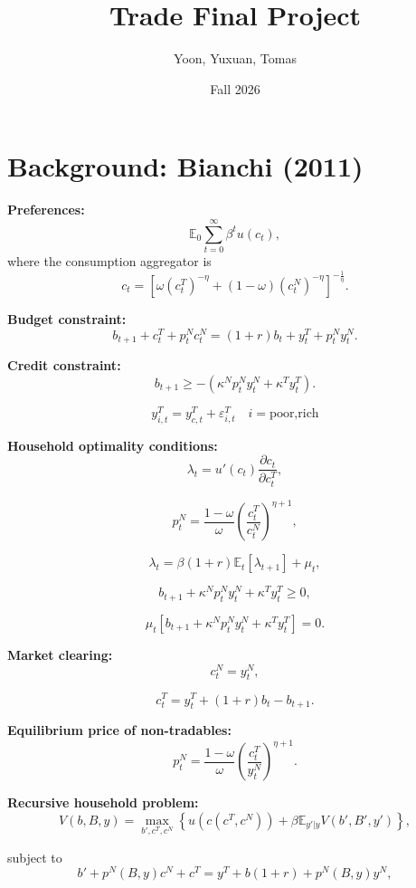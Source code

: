 \documentclass[11pt]{article}
\begin{document}
\title{Trade Final Project}


\author{Yoon, Yuxuan, Tomas}


\date{Fall 2026}

\maketitle
\tableofcontents{}

\large

\newpage

\section{Background: Bianchi (2011)}

\textbf{Preferences:}
\[
\mathbb{E}_0\sum_{t=0}^{\infty}\beta^t u(c_t),
\]
where the consumption aggregator is
\[
c_t
=
\left[
\omega (c_t^T)^{-\eta}
+
(1-\omega)(c_t^N)^{-\eta}
\right]^{-\frac{1}{\eta}}.
\]

\textbf{Budget constraint:}
\[
b_{t+1}+c_t^T+p_t^N c_t^N
=
(1+r)b_t+y_t^T+p_t^N y_t^N.
\]

\textbf{Credit constraint:}
\[
b_{t+1}
\geq
-\left(
\kappa^N p_t^N y_t^N
+
\kappa^T y_t^T
\right).
\]

$$y_{i,t}^{T} =
    y_{c,t}^T + \varepsilon_{i,t}^T  \quad 
    i=\text{poor,rich}$$

\textbf{Household optimality conditions:}
\[
\lambda_t=u'(c_t)\frac{\partial c_t}{\partial c_t^T},
\]

\[
p_t^N
=
\frac{1-\omega}{\omega}
\left(
\frac{c_t^T}{c_t^N}
\right)^{\eta+1},
\]

\[
\lambda_t
=
\beta(1+r)\mathbb{E}_t[\lambda_{t+1}]
+
\mu_t,
\]

\[
b_{t+1}
+
\kappa^N p_t^N y_t^N
+
\kappa^T y_t^T
\geq 0,
\]

\[
\mu_t
\left[
b_{t+1}
+
\kappa^N p_t^N y_t^N
+
\kappa^T y_t^T
\right]
=0.
\]

\textbf{Market clearing:}
\[
c_t^N=y_t^N,
\]

\[
c_t^T
=
y_t^T+(1+r)b_t-b_{t+1}.
\]

\textbf{Equilibrium price of non-tradables:}
\[
p_t^N
=
\frac{1-\omega}{\omega}
\left(
\frac{c_t^T}{y_t^N}
\right)^{\eta+1}.
\]

\textbf{Recursive household problem:}
\[
V(b,B,y)
=
\max_{b',c^T,c^N}
\left\{
u(c(c^T,c^N))
+
\beta\mathbb{E}_{y'|y}
V(b',B',y')
\right\},
\]

subject to
\[
b'
+
p^N(B,y)c^N
+
c^T
=
y^T+b(1+r)+p^N(B,y)y^N,
\]
\end{document}
